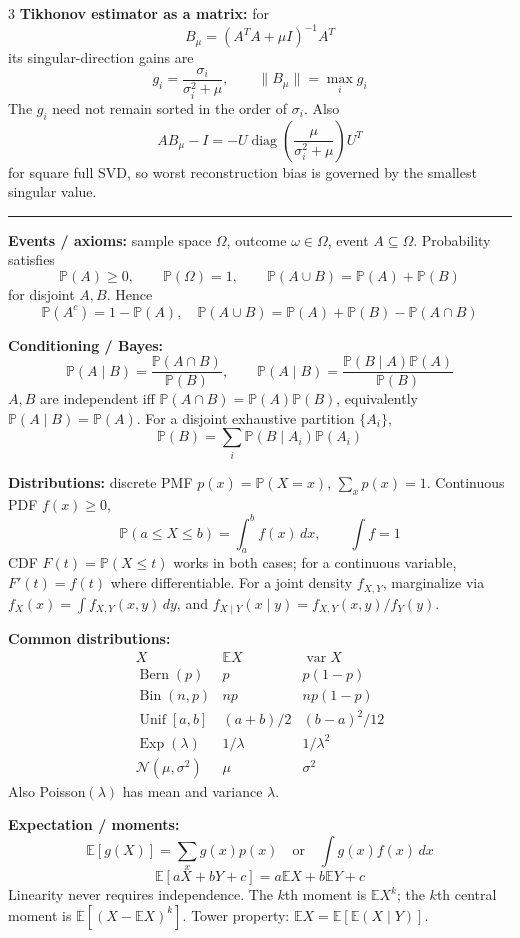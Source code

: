 \documentclass[10pt]{article}
\newcommand{\sect}[1]{\vspace{0.9pt}{\fontsize{7.2}{7.5}\selectfont\textbf{#1}}\vspace{0.25pt}\hrule\vspace{0.8pt}}
\newcommand{\sub}[1]{\textbf{#1}}
\newcommand{\diag}{\operatorname{diag}}
\newcommand{\E}{\mathbb{E}}
\newcommand{\Var}{\operatorname{var}}
\newcommand{\Prob}{\mathbb{P}}
\begin{document}
\begin{multicols*}{3}
\sub{Tikhonov estimator as a matrix:} for
\[
B_\mu=(A^TA+\mu I)^{-1}A^T
\]
its singular-direction gains are
\[
g_i=\frac{\sigma_i}{\sigma_i^2+\mu},\qquad
\|B_\mu\|=\max_i g_i
\]
The \(g_i\) need not remain sorted in the order of \(\sigma_i\). Also
\[
AB_\mu-I=-U\diag\left(\frac{\mu}{\sigma_i^2+\mu}\right)U^T
\]
for square full SVD, so worst reconstruction bias is governed by the
smallest singular value.

\sect{Probability Basics (Lecture 19)}
\sub{Events / axioms:} sample space \(\Omega\), outcome
\(\omega\in\Omega\), event \(A\subseteq\Omega\). Probability satisfies
\[
\Prob(A)\ge0,\qquad \Prob(\Omega)=1,\qquad
\Prob(A\cup B)=\Prob(A)+\Prob(B)
\]
for disjoint \(A,B\). Hence
\[
\Prob(A^c)=1-\Prob(A),\quad
\Prob(A\cup B)=\Prob(A)+\Prob(B)-\Prob(A\cap B)
\]

\sub{Conditioning / Bayes:}
\[
\Prob(A\mid B)=\frac{\Prob(A\cap B)}{\Prob(B)},\qquad
\Prob(A\mid B)=\frac{\Prob(B\mid A)\Prob(A)}{\Prob(B)}
\]
\(A,B\) are independent iff
\(\Prob(A\cap B)=\Prob(A)\Prob(B)\), equivalently
\(\Prob(A\mid B)=\Prob(A)\).
For a disjoint exhaustive partition \(\{A_i\}\),
\[
\Prob(B)=\sum_i\Prob(B\mid A_i)\Prob(A_i)
\]

\sub{Distributions:} discrete PMF \(p(x)=\Prob(X=x)\),
\(\sum_xp(x)=1\). Continuous PDF \(f(x)\ge0\),
\[
\Prob(a\le X\le b)=\int_a^b f(x)\,dx,\qquad \int f=1
\]
CDF \(F(t)=\Prob(X\le t)\) works in both cases; for a continuous variable,
\(F'(t)=f(t)\) where differentiable.
For a joint density \(f_{X,Y}\), marginalize via
\(f_X(x)=\int f_{X,Y}(x,y)\,dy\), and
\(f_{X\mid Y}(x\mid y)=f_{X,Y}(x,y)/f_Y(y)\).

\sub{Common distributions:}
\[
\begin{array}{c|c|c}
X&\E X&\Var X\\ \hline
\operatorname{Bern}(p)&p&p(1-p)\\
\operatorname{Bin}(n,p)&np&np(1-p)\\
\operatorname{Unif}[a,b]&(a+b)/2&(b-a)^2/12\\
\operatorname{Exp}(\lambda)&1/\lambda&1/\lambda^2\\
\mathcal N(\mu,\sigma^2)&\mu&\sigma^2
\end{array}
\]
Also Poisson\((\lambda)\) has mean and variance \(\lambda\).

\sub{Expectation / moments:}
\[
\E[g(X)]=\sum_xg(x)p(x)\quad\text{or}\quad
\int g(x)f(x)\,dx
\]
\[
\E[aX+bY+c]=a\E X+b\E Y+c
\]
Linearity never requires independence. The \(k\)th moment is \(\E X^k\);
the \(k\)th central moment is \(\E[(X-\E X)^k]\).
Tower property: \(\E X=\E[\E(X\mid Y)]\).


\end{multicols*}
\end{document}
